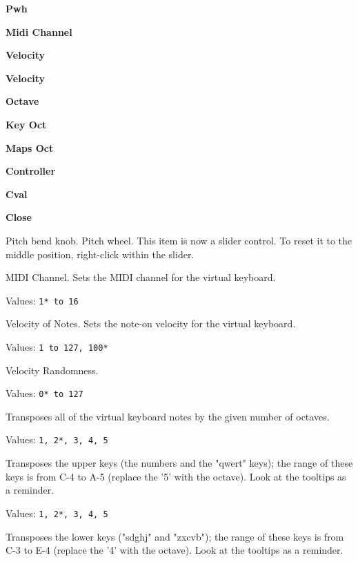    \begin{enumber}
      \item \textbf{Pwh}
      \item \textbf{Midi Channel}
      \item \textbf{Velocity}
      \item \textbf{Velocity}
      \item \textbf{Octave}
      \item \textbf{Key Oct}
      \item \textbf{Maps Oct}
      \item \textbf{Controller}
      \item \textbf{Cval}
      \item \textbf{Close}
   \end{enumber}

   Pitch bend knob. Pitch wheel.
   This item is now a slider control.  To reset it to the middle position,
   right-click within the slider.

%

   MIDI Channel.
   Sets the MIDI channel for the virtual keyboard.

   Values: \texttt{1* to 16}

   Velocity of Notes.
   Sets the note-on velocity for the virtual keyboard.

   Values: \texttt{1 to 127, 100*}

   Velocity Randomness.

   Values: \texttt{0* to 127}

   Transposes all of the virtual keyboard notes by the given number of
   octaves.

   Values: \texttt{1, 2*, 3, 4, 5}

   Transposes the upper keys (the numbers and the "qwert" keys);
   the range of these keys is from C-4 to A-5 (replace the '5' with the octave).
   Look at the tooltips as a reminder.

   Values: \texttt{1, 2*, 3, 4, 5}

   Transposes the lower keys ("sdghj" and "zxcvb"); the range of these keys is
   from C-3 to E-4 (replace the '4' with the octave).  Look at the tooltips as a
   reminder.

